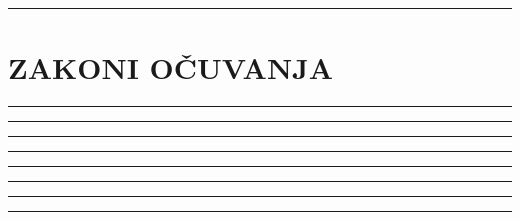 \documentclass[10pt]{book}
\newcounter{zadatak} %
\newcounter{cjelina}
\begin{document}
{\color{boja} \rule{\linewidth}{0.3mm} }

\vspace{0.2cm}


\vspace{0.2cm}

\newpage
\chapter{ZAKONI OČUVANJA}
\setcounter{zadatak}{0}




{\color{boja} \rule{\linewidth}{0.3mm} }

\vspace{0.2cm} 




{\color{boja} \rule{\linewidth}{0.3mm} }

\vspace{0.2cm}





{\color{boja} \rule{\linewidth}{0.3mm} }


\vspace{1cm}


{\color{boja} \rule{\linewidth}{0.3mm} }


\vspace{1cm}


{\color{boja} \rule{\linewidth}{0.3mm} }


\vspace{1cm}


{\color{boja} \rule{\linewidth}{0.3mm} }



\vspace{1cm}


{\color{boja} \rule{\linewidth}{0.3mm} }


\vspace{1cm}


{\color{boja} \rule{\linewidth}{0.3mm} }

\end{document}
